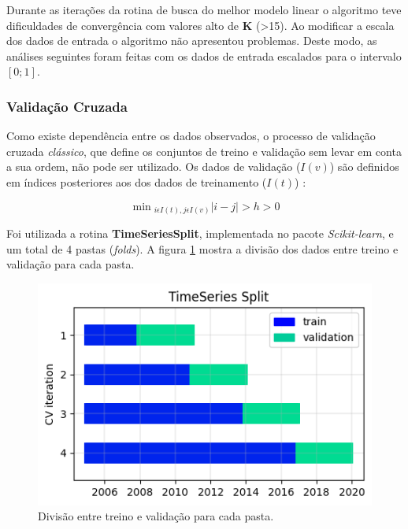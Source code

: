 \documentclass[final,5p]{elsarticle}
\numberwithin{equation}{section}
\begin{document}
    Durante as iterações da rotina de busca do melhor modelo linear o algoritmo teve dificuldades de convergência com valores alto de \textbf{K} (>15). Ao modificar a escala dos dados de entrada o algoritmo não apresentou problemas. Deste modo, as análises seguintes foram feitas com os dados de entrada escalados para o intervalo $[0;1]$.

    \subsubsection{Validação Cruzada}

    Como existe dependência entre os dados observados, o processo de validação cruzada \emph{clássico}, que define os conjuntos de treino e validação sem levar em conta a sua ordem, não pode ser utilizado. Os dados de validação ($I(v)$) são definidos em índices posteriores aos dos dados de treinamento ($I(t)$) \cite{10.1214/09-SS054}:

    \begin{equation}
        \min{}_{i \epsilon I(t), j \epsilon I(v)} |i - j| > h > 0
    \end{equation}

    Foi utilizada a rotina \textbf{TimeSeriesSplit}, implementada no pacote \emph{Scikit-learn}, e um total de 4 pastas (\emph{folds}). A figura \ref{fig:folds} mostra a divisão dos dados entre treino e validação para cada pasta.

    \begin{figure}[hbt!]
        \includegraphics[width=0.95\columnwidth]{B1_Folds.png}
        \caption{Divisão entre treino e validação para cada pasta.}
        \label{fig:folds}
    \end{figure}
\end{document}
